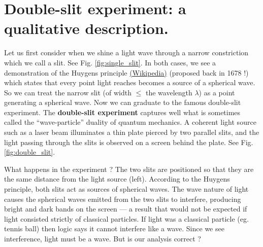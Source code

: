 \documentclass{Textbook}
\begin{document}
\section{Double-slit experiment: a qualitative description.}
Let us first consider when we shine a light wave through a narrow constriction which we call a slit. See Fig. \ref{fig:single_slit}. In both cases, we see a demonstration of the Huygens principle \href{http://en.wikipedia.org/wiki/Huygens\%E2\%80\%93Fresnel_principle}{(Wikipedia)}  (proposed back in 1678 !) which states that every point light reaches becomes a source of a spherical wave. So we can treat the narrow slit (of width $\le$ the wavelength $\lambda$) as a point generating a spherical wave. Now we can graduate to the famous double-slit experiment.
%
The \textbf{double-slit experiment} captures well what is sometimes called the ``wave-particle'' duality of quantum mechanics. A coherent light source such as a laser beam illuminates a thin plate pierced by two parallel slits, and the light passing through the slits is observed on a screen behind the plate. See Fig. \ref{fig:double_slit}.

%
What happens in the experiment ?
The two slits are positioned so that they are the same distance from the light source (left). According to the Huygens principle, both slits act as sources of spherical waves. The wave nature of light causes the spherical waves emitted from the two slits to interfere, producing bright and dark bands on the screen — a result that would not be expected if light consisted strictly of classical particles. If light was a classical particle (eg. tennis ball) then logic says it cannot interfere like a wave. Since we see interference, light must be a wave. But is our analysis correct ?
\end{document}
